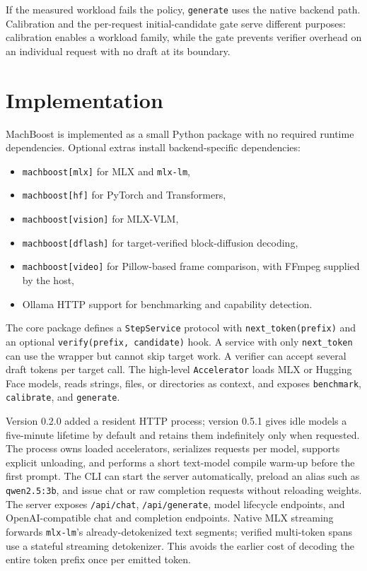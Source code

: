 \documentclass[11pt]{article}
\begin{document}
If the measured workload fails the policy, \texttt{generate} uses the native backend path. Calibration and the per-request initial-candidate gate serve different purposes: calibration enables a workload family, while the gate prevents verifier overhead on an individual request with no draft at its boundary.

\section{Implementation}
MachBoost is implemented as a small Python package with no required runtime dependencies. Optional extras install backend-specific dependencies:
\begin{itemize}[leftmargin=*]
  \item \texttt{machboost[mlx]} for MLX and \texttt{mlx-lm},
  \item \texttt{machboost[hf]} for PyTorch and Transformers,
  \item \texttt{machboost[vision]} for MLX-VLM,
  \item \texttt{machboost[dflash]} for target-verified block-diffusion decoding,
  \item \texttt{machboost[video]} for Pillow-based frame comparison, with FFmpeg supplied by the host,
  \item Ollama HTTP support for benchmarking and capability detection.
\end{itemize}

The core package defines a \texttt{StepService} protocol with \texttt{next\_token(prefix)} and an optional \texttt{verify(prefix, candidate)} hook. A service with only \texttt{next\_token} can use the wrapper but cannot skip target work. A verifier can accept several draft tokens per target call. The high-level \texttt{Accelerator} loads MLX or Hugging Face models, reads strings, files, or directories as context, and exposes \texttt{benchmark}, \texttt{calibrate}, and \texttt{generate}.

Version 0.2.0 added a resident HTTP process; version 0.5.1 gives idle models a five-minute lifetime by default and retains them indefinitely only when requested. The process owns loaded accelerators, serializes requests per model, supports explicit unloading, and performs a short text-model compile warm-up before the first prompt. The CLI can start the server automatically, preload an alias such as \texttt{qwen2.5:3b}, and issue chat or raw completion requests without reloading weights. The server exposes \texttt{/api/chat}, \texttt{/api/generate}, model lifecycle endpoints, and OpenAI-compatible chat and completion endpoints. Native MLX streaming forwards \texttt{mlx-lm}'s already-detokenized text segments; verified multi-token spans use a stateful streaming detokenizer. This avoids the earlier cost of decoding the entire token prefix once per emitted token.
\end{document}
